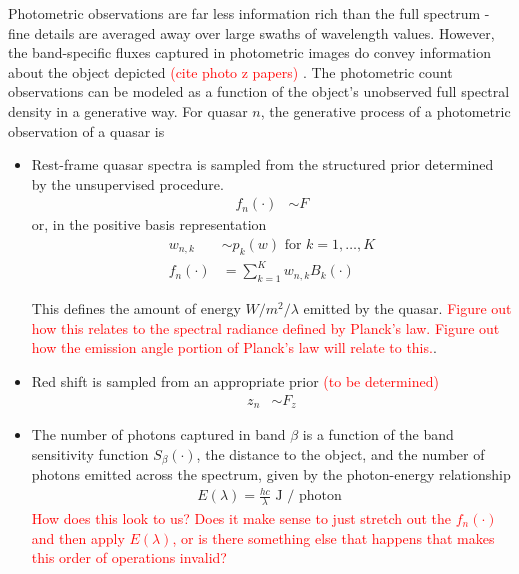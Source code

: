 \documentclass[11pt]{article}
\newcommand{\red}[1]{\textcolor{red}{#1}}
\begin{document}
Photometric observations are far less information rich than the full spectrum - fine details are averaged away over large swaths of wavelength values.  However, the band-specific fluxes captured in photometric images do convey information about the object depicted \red{ (cite photo z papers) }.  The photometric count observations can be modeled as a function of the object's unobserved full spectral density in a generative way.  For quasar $n$, the generative process of a photometric observation of a quasar is 
\begin{itemize}
\item Rest-frame quasar spectra is sampled from the structured prior determined by the unsupervised procedure. 
\begin{align}
  f_n(\cdot) &\sim F
\end{align}
or, in the positive basis representation
\begin{align}
  w_{n,k} &\sim p_k(w) \text{ for } k = 1, \dots, K \\
  f_n(\cdot) &= \sum_{k=1}^K w_{n,k} B_k(\cdot)
\end{align}

This defines the amount of energy $W / m^2 / \lambda$ emitted by the quasar.  
\red{Figure out how this relates to the spectral radiance defined by Planck's law.  Figure out how the emission angle portion of Planck's law will relate to this.}.  

\item Red shift is sampled from an appropriate prior \red{(to be determined)}
\begin{align}
  z_n &\sim F_z
\end{align}

\item The number of photons captured in band $\beta$ is a function of the band sensitivity function $S_\beta(\cdot)$, the distance to the object, and the number of photons emitted across the spectrum, given by the photon-energy relationship
\begin{align}
E(\lambda) = \frac{hc}{\lambda} \text{ J / photon }
\end{align}
\red{How does this look to us?  Does it make sense to just stretch out the $f_n(\cdot)$ and then apply $E(\lambda)$, or is there something else that happens that makes this order of operations invalid?}


\end{itemize}
\end{document}
